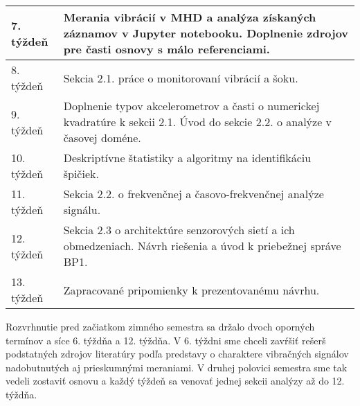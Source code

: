 \begin{table}[h!]
\begin{tabular}{|l|p{12cm}|}
7. týždeň         & Merania vibrácií v MHD a analýza získaných záznamov v Jupyter notebooku. Doplnenie zdrojov pre časti osnovy s málo referenciami.                                                                  \\ \hline
8. týždeň         & Sekcia 2.1. práce o monitorovaní vibrácií a šoku.                                                                                                                                                                                             \\ \hline
9. týždeň         & Doplnenie typov akcelerometrov a časti o numerickej kvadratúre k sekcii 2.1. Úvod do sekcie 2.2. o analýze v časovej doméne.                                                                       \\ \hline
10. týždeň        & Deskriptívne štatistiky a algoritmy na identifikáciu špičiek.                                                                                                                                                                                 \\ \hline
11. týždeň        & Sekcia 2.2. o frekvenčnej a časovo-frekvenčnej analýze signálu.                                                                                                                                                                               \\ \hline
12. týždeň        & Sekcia 2.3 o architektúre senzorových sietí a ich obmedzeniach. Návrh riešenia a úvod k priebežnej správe BP1. \\ \hline
13. týždeň        & Zapracované pripomienky k prezentovanému návrhu.                                                                                                                                                                             \\ \hline
\end{tabular}
\end{table}

Rozvrhnutie pred začiatkom zimného semestra sa držalo dvoch oporných termínov a síce 6. týždňa a 12. týždňa.
V 6. týždni sme chceli zavŕšiť rešerš podstatných zdrojov literatúry podľa predstavy o charaktere vibračných signálov
nadobutnutých aj prieskumnými meraniami. V druhej polovici semestra sme tak vedeli zostaviť osnovu a každý týždeň
sa venovať jednej sekcii analýzy až do 12. týždňa.

\clearpage
\newpage


